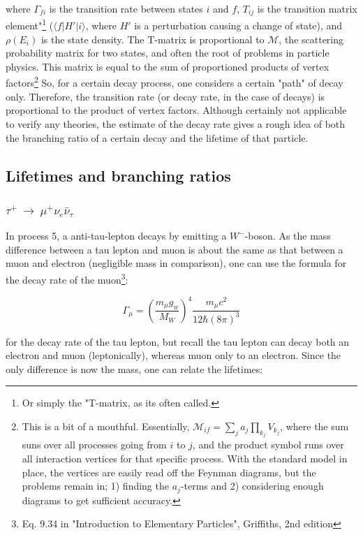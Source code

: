 \documentclass[11pt,a4paper]{article}
\begin{document}
where $\Gamma_{fi}$ is the transition rate between states $i$ and $f$, $T_{ij}$ is the transition matrix element"\footnote{Or simply the "T-matrix, as its often called.} ($\langle f|H'|i\rangle$, where $H'$ is a perturbation causing a change of state), and $\rho(E_i)$ is the state density. The T-matrix is proportional to $\mathcal{M}$, the scattering probability matrix for two states, and often the root of problems in particle physics. This matrix is equal to the sum of proportioned products of vertex factors\footnote{This is a bit of a mouthful. Essentially, $\mathcal{M}_{if} = \sum_j a_j\prod_{k_j}V_{k_j}$, where the sum suns over all processes going from $i$ to $j$, and the product symbol runs over all interaction vertices for that specific process. With the standard model in place, the vertices are easily read off the Feynman diagrams, but the problems remain in; 1) finding the $a_j$-terms and 2) considering enough diagrams to get sufficient accuracy.} So, for a certain decay process, one considers a certain "path" of decay only. Therefore, the transition rate (or decay rate, in the case of decays) is proportional to the product of vertex factors. Although certainly not applicable to verify any theories, the estimate of the decay rate gives a rough idea of both the branching ratio of a certain decay and the lifetime of that particle.

\subsection{Lifetimes and branching ratios}
\subsubsection{$\tau^+ \:\rightarrow\: \mu^+\nu_e\bar{\nu}_\tau$}
In process 5, a anti-tau-lepton decays by emitting a $W^-$-boson. As the mass difference between a tau lepton and muon is about the same as that between a muon and electron (negligible mass in comparison), one can use the formula for the decay rate of the muon\footnote{Eq. 9.34 in "Introduction to Elementary Particles", Griffiths, 2nd edition}:

\begin{equation}
	\Gamma_\mu = \left(\frac{m_\mu g_w}{M_W}\right)^4 \frac{m_\mu c^2}{12\hbar(8\pi)^3}
	\label{decay_width}
\end{equation}

for the decay rate of the tau lepton, but recall the tau lepton can decay both an electron and muon (leptonically), whereas muon only to an electron. Since the only difference is now the mass, one can relate the lifetimes:
\end{document}
